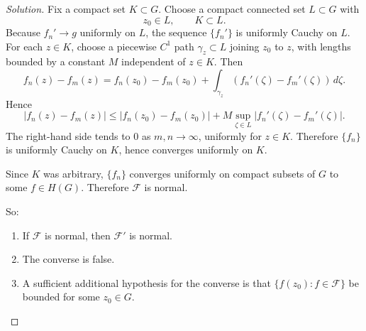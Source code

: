 \documentclass[12pt, a4paper]{report}
\theoremstyle{spaced}
\begin{document}
\begin{proof}[Solution]
	Fix a compact set \(K\subset G\). Choose a compact connected set \(L\subset G\) with
	\[
		z_0\in L,\qquad K\subset L.
	\]
	Because \(f_n'\to g\) uniformly on \(L\), the sequence \(\{f_n'\}\) is uniformly Cauchy on \(L\). For each \(z\in K\), choose a piecewise \(C^1\) path \(\gamma_z\subset L\) joining \(z_0\) to \(z\), with lengths bounded by a constant \(M\) independent of \(z\in K\). Then
	\[
		f_n(z)-f_m(z)
		=
		f_n(z_0)-f_m(z_0)+\int_{\gamma_z}(f_n'(\zeta)-f_m'(\zeta))\,d\zeta.
	\]
	Hence
	\[
		|f_n(z)-f_m(z)|
		\le
		|f_n(z_0)-f_m(z_0)|
		+
		M\sup_{\zeta\in L}|f_n'(\zeta)-f_m'(\zeta)|.
	\]
	The right-hand side tends to \(0\) as \(m,n\to\infty\), uniformly for \(z\in K\). Therefore \(\{f_n\}\) is uniformly Cauchy on \(K\), hence converges uniformly on \(K\).

	Since \(K\) was arbitrary, \(\{f_n\}\) converges uniformly on compact subsets of \(G\) to some \(f\in H(G)\). Therefore \(\mathcal F\) is normal.

	\medskip
	So:
	\begin{enumerate}
		\item If \(\mathcal F\) is normal, then \(\mathcal F'\) is normal.
		\item The converse is false.
		\item A sufficient additional hypothesis for the converse is that \(\{f(z_0):f\in\mathcal F\}\) be bounded for some \(z_0\in G\).
	\end{enumerate}
\end{proof}
\end{document}
